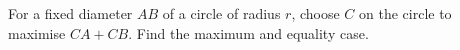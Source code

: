 For a fixed diameter $AB$ of a circle of radius $r$, choose $C$ on the circle to maximise $CA+CB$. Find the maximum and equality case.
